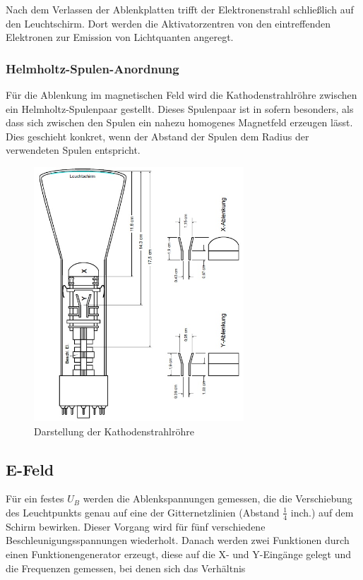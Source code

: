 Nach dem Verlassen der Ablenkplatten trifft der Elektronenstrahl
schließlich auf den Leuchtschirm. Dort werden die Aktivatorzentren von den eintreffenden Elektronen zur Emission von Lichtquanten angeregt.

\subsubsection{Helmholtz-Spulen-Anordnung}

Für die Ablenkung im magnetischen Feld wird die Kathodenstrahlröhre zwischen ein Helmholtz-Spulenpaar gestellt. Dieses Spulenpaar ist in sofern besonders, als dass sich zwischen den Spulen ein nahezu homogenes Magnetfeld erzeugen lässt.\\
Dies geschieht konkret, wenn der Abstand der Spulen dem Radius der verwendeten Spulen entspricht. \\

\begin{figure}[h]
  \centering
  \includegraphics[width=0.7\textwidth, angle=270]{Grafiken/V501(2)_Abb3.jpg}
  \caption{Darstellung der Kathodenstrahlröhre }
\end{figure}
\newpage
\subsection{E-Feld}

Für ein festes $U_B$ werden die Ablenkspannungen gemessen, die die Verschiebung des Leuchtpunkts genau auf eine der Gitternetzlinien (Abstand $\frac{1}{4}$ inch.) auf dem Schirm bewirken. Dieser Vorgang wird für
fünf verschiedene Beschleunigungsspannungen wiederholt.
Danach werden zwei Funktionen durch einen Funktionengenerator erzeugt, diese auf die X- und Y-Eingänge gelegt und die Frequenzen gemessen, bei denen sich das Verhältnis 

